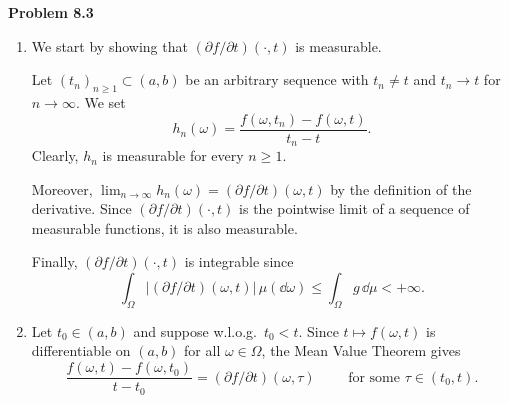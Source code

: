 \bigskip

\textbf{Problem 8.3} 

\begin{enumerate}[label={(\alph*)}]
	\item {} 
	
	We start by showing that $(\partial f/\partial t)(\cdot,t)$ is measurable. 
	
	Let $(t_n)_{n\ge 1}\subset(a,b)$ be an arbitrary sequence with $t_n\ne t$ and $t_n\to t$ for $n\to\infty$. We set
	\[
		h_n(\omega) = \frac{f(\omega,t_n)-f(\omega,t)}{t_n-t}.
	\]
	Clearly, $h_n$ is measurable for every $n\ge 1$. 
	
	Moreover, $\lim_{n\to\infty} h_n(\omega) = (\partial f/\partial t)(\omega,t)$ by the definition of the derivative. Since $(\partial f/\partial t)(\cdot,t)$ is the pointwise limit of a sequence of measurable functions, it is also measurable. 
	
	Finally, $(\partial f/\partial t)(\cdot,t)$ is integrable since
	\[
		\int_\Omega |(\partial f/\partial t)(\omega,t)|\,\mu(\dd\omega) \le \int_\Omega g\,\dd\mu <+\infty.
	\]
	
	\item {}
	
	Let $t_0\in (a,b)$ and suppose w.l.o.g.\ $t_0<t$. Since $t\mapsto f(\omega,t)$ is differentiable on $(a,b)$ for all $\omega\in\Omega$, the Mean Value Theorem gives
	\[
		\frac{f(\omega,t)-f(\omega,t_0)}{t-t_0} = (\partial f/\partial t)(\omega,\tau)\qquad\text{	for some $\tau\in(t_0,t)$.}
	\]
	

\end{enumerate}
